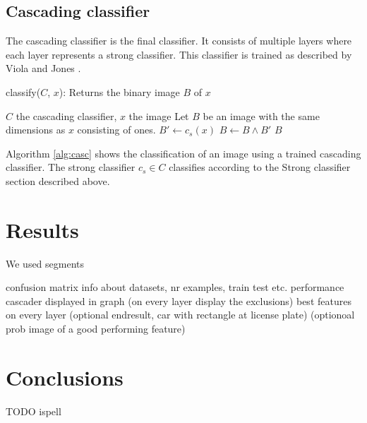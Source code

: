 \documentclass[a4paper,11pt]{article}
\begin{document}
\subsection*{Cascading classifier}
The cascading classifier is the final classifier. It consists of multiple
layers where each layer represents a strong classifier. This classifier is
trained as described by Viola and Jones \cite{viola}. 
\begin{algorithm}
	\caption{classify($C$, $x$): Returns the binary image $B$ of $x$}
	\begin{algorithmic}[1]
	\REQUIRE $C$ the cascading classifier, $x$ the image
	\medskip
	\STATE Let $B$ be an image with the same dimensions as $x$ consisting of ones.
		\STATE $B' \leftarrow c_s(x)$
		\STATE $B \leftarrow B \land B'$
	\ENDFOR
	\RETURN $B$
	\end{algorithmic}
\label{alg:casc}
\end{algorithm}
Algorithm \ref{alg:casc} shows the classification of an image using a trained
cascading classifier. The strong classifier $c_s \in C$ classifies according to
the Strong classifier section described above.

\section*{Results}
We used segments

confusion matrix
info about datasets, nr examples, train test etc.
performance cascader displayed in graph (on every layer display the exclusions)
best features on every layer
(optional endresult, car with rectangle at license plate)
(optionoal prob image of a good performing feature)


\section*{Conclusions}
TODO ispell

\renewcommand\bibname{References}


\end{document}

